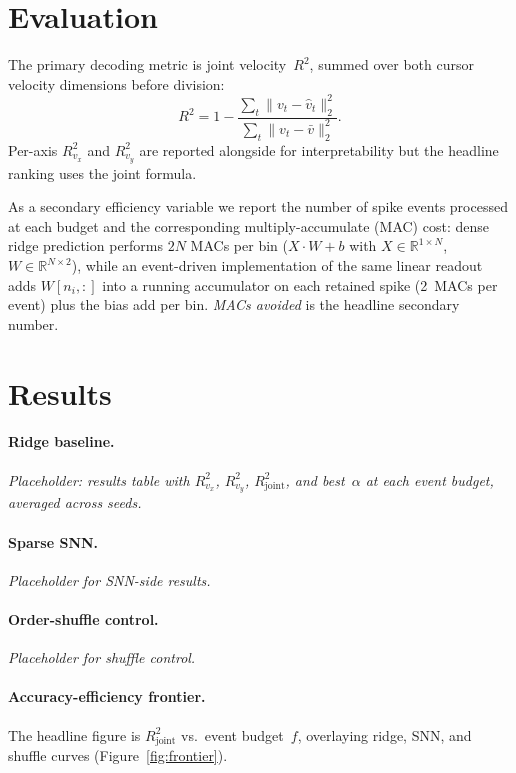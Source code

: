 \documentclass[11pt]{article}
\begin{document}
\section{Evaluation}

The primary decoding metric is joint velocity~$R^2$, summed over both
cursor velocity dimensions before division:
\[
R^2 = 1 - \frac{\sum_t \| v_t - \hat v_t \|_2^2}
                {\sum_t \| v_t - \bar v \|_2^2}.
\]
Per-axis $R^2_{v_x}$ and $R^2_{v_y}$ are reported alongside for
interpretability but the headline ranking uses the joint formula.

As a secondary efficiency variable we report the number of spike events
processed at each budget and the corresponding multiply-accumulate
(MAC) cost: dense ridge prediction performs $2N$ MACs per bin
($X \cdot W + b$ with $X \in \mathbb{R}^{1\times N}$,
$W \in \mathbb{R}^{N\times 2}$), while an event-driven implementation
of the same linear readout adds $W[n_i,:]$ into a running accumulator
on each retained spike (2~MACs per event) plus the bias add per bin.
\emph{MACs avoided} is the headline secondary number.

\section{Results}

\paragraph{Ridge baseline.} \emph{Placeholder: results table with
$R^2_{v_x}$, $R^2_{v_y}$, $R^2_{\text{joint}}$, and best~$\alpha$ at each
event budget, averaged across seeds.}

\paragraph{Sparse SNN.} \emph{Placeholder for SNN-side results.}

\paragraph{Order-shuffle control.} \emph{Placeholder for shuffle
control.}

\paragraph{Accuracy-efficiency frontier.}
The headline figure is $R^2_{\text{joint}}$ vs.\ event budget~$f$,
overlaying ridge, SNN, and shuffle curves
(Figure~\ref{fig:frontier}).
\end{document}
